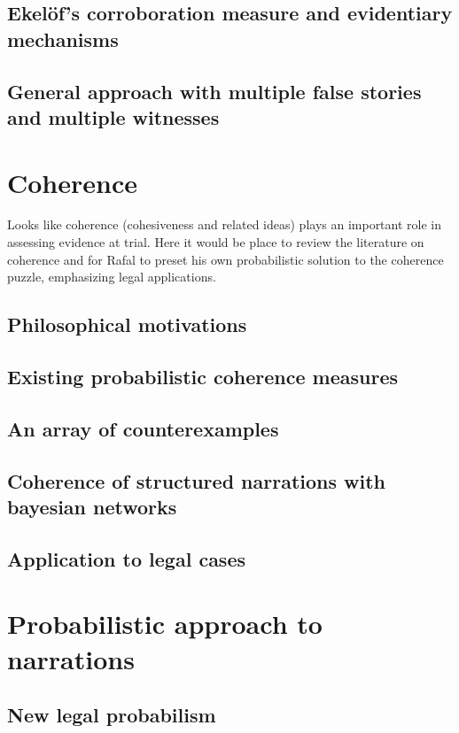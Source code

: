 \documentclass[]{book}
\begin{document}
\section{Ekel\"of's corroboration measure and evidentiary mechanisms}

\section{General approach  with multiple false stories and multiple witnesses}

\chapter{Coherence}

Looks like coherence (cohesiveness and related ideas) plays an important
role in assessing evidence at trial. Here it would be place to review
the literature on coherence and for Rafal to preset his own
probabilistic solution to the coherence puzzle, emphasizing legal
applications.

\section{Philosophical motivations}

\section{Existing probabilistic coherence measures}

\section{An array of counterexamples}

\section{Coherence of structured narrations with bayesian networks}

\section{Application to legal cases}

\chapter{Probabilistic approach to narrations}

\section{New legal probabilism}
\end{document}
